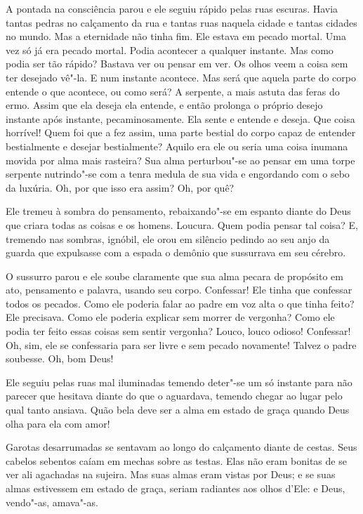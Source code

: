 A pontada na consciência parou e ele seguiu rápido pelas ruas escuras.
Havia tantas pedras no calçamento da rua e tantas ruas naquela cidade e
tantas cidades no mundo. Mas a eternidade não tinha fim. Ele estava em
pecado mortal. Uma vez só já era pecado mortal. Podia acontecer a
qualquer instante. Mas como podia ser tão rápido? Bastava ver ou pensar
em ver. Os olhos veem a coisa sem ter desejado vê"-la. E num instante
acontece. Mas será que aquela parte do corpo entende o que acontece, ou
como será? A serpente, a mais astuta das feras do ermo. Assim que ela
deseja ela entende, e então prolonga o próprio desejo instante após
instante, pecaminosamente. Ela sente e entende e deseja. Que coisa
horrível! Quem foi que a fez assim, uma parte bestial do corpo capaz de
entender bestialmente e desejar bestialmente? Aquilo era ele ou seria
uma coisa inumana movida por alma mais rasteira? Sua alma perturbou"-se
ao pensar em uma torpe serpente nutrindo"-se com a tenra medula de sua
vida e engordando com o sebo da luxúria. Oh, por que isso era assim? Oh,
por quê?

Ele tremeu à sombra do pensamento, rebaixando"-se em espanto diante do
Deus que criara todas as coisas e os homens. Loucura. Quem podia pensar
tal coisa? E, tremendo nas sombras, ignóbil, ele orou em silêncio
pedindo ao seu anjo da guarda que expulsasse com a espada o demônio que
sussurrava em seu cérebro.

O sussurro parou e ele soube claramente que sua alma pecara de propósito
em ato, pensamento e palavra, usando seu corpo. Confessar! Ele tinha que
confessar todos os pecados. Como ele poderia falar ao padre em voz alta
o que tinha feito? Ele precisava. Como ele poderia explicar
sem morrer de vergonha? Como ele podia ter feito essas coisas sem sentir
vergonha? Louco, louco odioso! Confessar! Oh, sim, ele se confessaria
para ser livre e sem pecado novamente! Talvez o padre soubesse. Oh, bom
Deus!

Ele seguiu pelas ruas mal iluminadas temendo deter"-se um só instante
para não parecer que hesitava diante do que o aguardava, temendo chegar
ao lugar pelo qual tanto ansiava. Quão bela deve ser a alma em estado
de graça quando Deus olha para ela com amor!

Garotas desarrumadas se sentavam ao longo do calçamento diante de
cestas. Seus cabelos sebentos caíam em mechas sobre as testas. Elas não
eram bonitas de se ver ali agachadas na sujeira. Mas suas almas eram
vistas por Deus; e se suas almas estivessem em estado de graça, seriam
radiantes aos olhos d’Ele: e Deus, vendo"-as, amava"-as.

